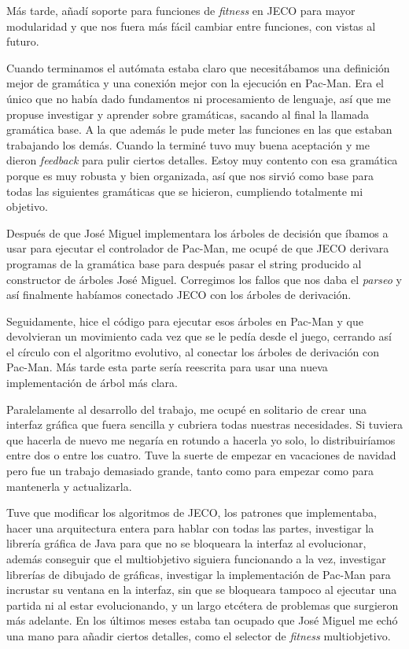 Más tarde, añadí soporte para funciones de \textit{fitness} en JECO para mayor modularidad y que nos fuera más fácil cambiar entre funciones, con vistas al futuro.

Cuando terminamos el autómata estaba claro que necesitábamos una definición mejor de gramática y una conexión mejor con la ejecución en Pac-Man. Era el único que no había dado fundamentos ni procesamiento de lenguaje, así que me propuse investigar y aprender sobre gramáticas, sacando al final la llamada gramática base. A la que además le pude meter las funciones en las que estaban trabajando los demás. Cuando la terminé tuvo muy buena aceptación y me dieron \textit{feedback} para pulir ciertos detalles. Estoy muy contento con esa gramática porque es muy robusta y bien organizada, así que nos sirvió como base para todas las siguientes gramáticas que se hicieron, cumpliendo totalmente mi objetivo.

Después de que José Miguel implementara los árboles de decisión que íbamos a usar para ejecutar el controlador de Pac-Man, me ocupé de que JECO derivara programas de la gramática base para después pasar el string producido al constructor de árboles José Miguel. Corregimos los fallos que nos daba el \textit{parseo} y así finalmente habíamos conectado JECO con los árboles de derivación.

Seguidamente, hice el código para ejecutar esos árboles en Pac-Man y que devolvieran un movimiento cada vez que se le pedía desde el juego, cerrando así el círculo con el algoritmo evolutivo, al conectar los árboles de derivación con Pac-Man. Más tarde esta parte sería reescrita para usar una nueva implementación de árbol más clara.

Paralelamente al desarrollo del trabajo, me ocupé en solitario de crear una interfaz gráfica que fuera sencilla y cubriera todas nuestras necesidades. Si tuviera que hacerla de nuevo me negaría en rotundo a hacerla yo solo, lo distribuiríamos entre dos o entre los cuatro. Tuve la suerte de empezar en vacaciones de navidad pero fue un trabajo demasiado grande, tanto como para empezar como para mantenerla y actualizarla.

Tuve que modificar los algoritmos de JECO, los patrones que implementaba, hacer una arquitectura entera para hablar con todas las partes, investigar la librería gráfica de Java para que no se bloqueara la interfaz al evolucionar, además conseguir que el multiobjetivo siguiera funcionando a la vez, investigar librerías de dibujado de gráficas, investigar la implementación de Pac-Man para incrustar su ventana en la interfaz, sin que se bloqueara tampoco al ejecutar una partida ni al estar evolucionando, y un largo etcétera de problemas que surgieron más adelante.
En los últimos meses estaba tan ocupado que José Miguel me echó una mano para añadir ciertos detalles, como el selector de \textit{fitness} multiobjetivo.

